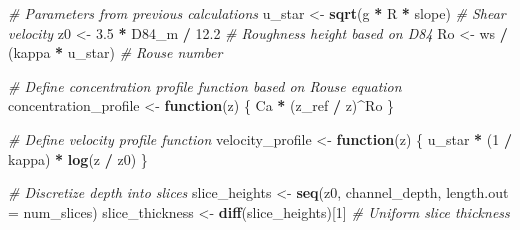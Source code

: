 \documentclass[
]{article}
\newenvironment{Shaded}{\begin{snugshade}}{\end{snugshade}}
\newcommand{\AttributeTok}[1]{\textcolor[rgb]{0.13,0.29,0.53}{#1}}
\newcommand{\CommentTok}[1]{\textcolor[rgb]{0.56,0.35,0.01}{\textit{#1}}}
\newcommand{\ControlFlowTok}[1]{\textcolor[rgb]{0.13,0.29,0.53}{\textbf{#1}}}
\newcommand{\DecValTok}[1]{\textcolor[rgb]{0.00,0.00,0.81}{#1}}
\newcommand{\FloatTok}[1]{\textcolor[rgb]{0.00,0.00,0.81}{#1}}
\newcommand{\FunctionTok}[1]{\textcolor[rgb]{0.13,0.29,0.53}{\textbf{#1}}}
\newcommand{\NormalTok}[1]{#1}
\newcommand{\OtherTok}[1]{\textcolor[rgb]{0.56,0.35,0.01}{#1}}
\newcommand{\SpecialCharTok}[1]{\textcolor[rgb]{0.81,0.36,0.00}{\textbf{#1}}}
\begin{document}
\begin{Shaded}
\begin{Highlighting}[]
\CommentTok{\# Parameters from previous calculations}
\NormalTok{u\_star }\OtherTok{\textless{}{-}} \FunctionTok{sqrt}\NormalTok{(g }\SpecialCharTok{*}\NormalTok{ R }\SpecialCharTok{*}\NormalTok{ slope)  }\CommentTok{\# Shear velocity }
\NormalTok{z0 }\OtherTok{\textless{}{-}} \FloatTok{3.5} \SpecialCharTok{*}\NormalTok{ D84\_m }\SpecialCharTok{/} \FloatTok{12.2}       \CommentTok{\# Roughness height based on D84}
\NormalTok{Ro }\OtherTok{\textless{}{-}}\NormalTok{ ws }\SpecialCharTok{/}\NormalTok{ (kappa }\SpecialCharTok{*}\NormalTok{ u\_star)    }\CommentTok{\# Rouse number }

\CommentTok{\# Define concentration profile function based on Rouse equation}
\NormalTok{concentration\_profile }\OtherTok{\textless{}{-}} \ControlFlowTok{function}\NormalTok{(z) \{}
\NormalTok{  Ca }\SpecialCharTok{*}\NormalTok{ (z\_ref }\SpecialCharTok{/}\NormalTok{ z)}\SpecialCharTok{\^{}}\NormalTok{Ro}
\NormalTok{\}}

\CommentTok{\# Define velocity profile function}
\NormalTok{velocity\_profile }\OtherTok{\textless{}{-}} \ControlFlowTok{function}\NormalTok{(z) \{}
\NormalTok{  u\_star }\SpecialCharTok{*}\NormalTok{ (}\DecValTok{1} \SpecialCharTok{/}\NormalTok{ kappa) }\SpecialCharTok{*} \FunctionTok{log}\NormalTok{(z }\SpecialCharTok{/}\NormalTok{ z0)}
\NormalTok{\}}

\CommentTok{\# Discretize depth into slices}
\NormalTok{slice\_heights }\OtherTok{\textless{}{-}} \FunctionTok{seq}\NormalTok{(z0, channel\_depth, }\AttributeTok{length.out =}\NormalTok{ num\_slices)}
\NormalTok{slice\_thickness }\OtherTok{\textless{}{-}} \FunctionTok{diff}\NormalTok{(slice\_heights)[}\DecValTok{1}\NormalTok{]  }\CommentTok{\# Uniform slice thickness}
\end{Highlighting}
\end{Shaded}
\end{document}
